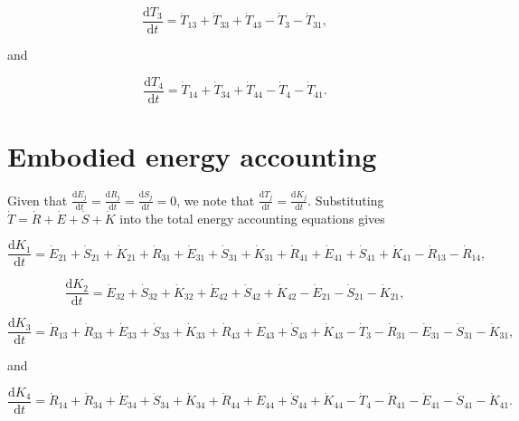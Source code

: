 \begin{equation} \label{eq:D-CV_T_3}
	\frac{\mathrm{d}T_{3}}{\mathrm{d}t} 	 = \dot{T}_{13} + \dot{T}_{33} + \dot{T}_{43} - \dot{T}_{3} - \dot{T}_{31},
\end{equation}

\noindent and 

\begin{equation} \label{eq:D-CV_T_4}
	\frac{\mathrm{d}T_{4}}{\mathrm{d}t} 	 = \dot{T}_{14} + \dot{T}_{34} + \dot{T}_{44} - \dot{T}_{4} - \dot{T}_{41}.
\end{equation}


\section{Embodied energy accounting}

Given that $\frac{\mathrm{d}E_{j}}{\mathrm{d}t} = \frac{\mathrm{d}R_{j}}{\mathrm{d}t} = \frac{\mathrm{d}S_{j}}{\mathrm{d}t} = 0$, we note that $\frac{\mathrm{d}T_j}{\mathrm{d}t} = \frac{\mathrm{d}K_j}{\mathrm{d}t}$. Substituting $\dot{T} = \dot{R} + \dot{E} + \dot{S} + \dot{K}$ into the total energy accounting equations gives

\begin{equation} \label{eq:D-CV_dB_1}
	\frac{\mathrm{d}K_{1}}{\mathrm{d}t} 	 = \dot{E}_{21} + \dot{S}_{21} + \dot{K}_{21} + \dot{R}_{31} + \dot{E}_{31} + \dot{S}_{31} + \dot{K}_{31} + \dot{R}_{41} + \dot{E}_{41} + \dot{S}_{41} + \dot{K}_{41} - \dot{R}_{13} - \dot{R}_{14},
\end{equation}

\begin{equation} \label{eq:D-CV_dB_2}
	\frac{\mathrm{d}K_{2}}{\mathrm{d}t} 	 = \dot{E}_{32} + \dot{S}_{32} + \dot{K}_{32} + \dot{E}_{42} + \dot{S}_{42} + \dot{K}_{42} - \dot{E}_{21} - \dot{S}_{21} - \dot{K}_{21},
\end{equation}

\begin{equation} \label{eq:D-CV_dB_3}
	\frac{\mathrm{d}K_{3}}{\mathrm{d}t} 	 = \dot{R}_{13} + \dot{R}_{33} + \dot{E}_{33} + \dot{S}_{33} + \dot{K}_{33} + \dot{R}_{43} + \dot{E}_{43} + \dot{S}_{43} + \dot{K}_{43} - \dot{T}_{3} - \dot{R}_{31} - \dot{E}_{31} - \dot{S}_{31} - \dot{K}_{31},
\end{equation}

\noindent and 

\begin{equation} \label{eq:D-CV_dB_4}
	\frac{\mathrm{d}K_{4}}{\mathrm{d}t} 	 = \dot{R}_{14} + \dot{R}_{34} + \dot{E}_{34} + \dot{S}_{34} + \dot{K}_{34} + \dot{R}_{44} + \dot{E}_{44} + \dot{S}_{44} + \dot{K}_{44} - \dot{T}_{4} - \dot{R}_{41} - \dot{E}_{41} - \dot{S}_{41} - \dot{K}_{41}.
\end{equation}

